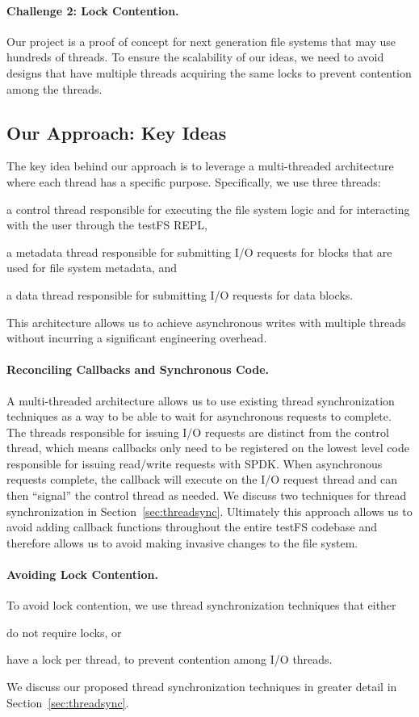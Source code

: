 \paragraph{Challenge 2: Lock Contention.}
Our project is a proof of concept for next generation file systems that may use
hundreds of threads. To ensure the scalability of our ideas, we need to avoid
designs that have multiple threads acquiring the same locks to prevent
contention among the threads.

\subsection{Our Approach: Key Ideas}
The key idea behind our approach is to leverage a multi-threaded architecture
where each thread has a specific purpose. Specifically, we use three threads:
\begin{enumerate*}[label={(\roman*)}]
  \item a control thread responsible for executing the file system logic and
    for interacting with the user through the testFS REPL,
  \item a metadata thread responsible for submitting I/O requests for blocks
    that are used for file system metadata, and
  \item a data thread responsible for submitting I/O requests for data blocks.
\end{enumerate*}
This architecture allows us to achieve asynchronous writes with multiple
threads without incurring a significant engineering overhead.

\paragraph{Reconciling Callbacks and Synchronous Code.}
A multi-threaded architecture allows us to use existing thread synchronization
techniques as a way to be able to wait for asynchronous requests to complete.
The threads responsible for issuing I/O requests are distinct from the control
thread, which means callbacks only need to be registered on the lowest level
code responsible for issuing read/write requests with SPDK. When asynchronous
requests complete, the callback will execute on the I/O request thread and can
then ``signal'' the control thread as needed. We discuss two techniques for
thread synchronization in Section~\ref{sec:threadsync}. Ultimately this
approach allows us to avoid adding callback functions throughout the entire
testFS codebase and therefore allows us to avoid making invasive changes to the
file system.

\paragraph{Avoiding Lock Contention.}
To avoid lock contention, we use thread synchronization techniques that either
\begin{enumerate*}
  \item do not require locks, or
  \item have a lock per thread, to prevent contention among I/O threads.
\end{enumerate*}
We discuss our proposed thread synchronization techniques in greater detail in
Section~\ref{sec:threadsync}.
